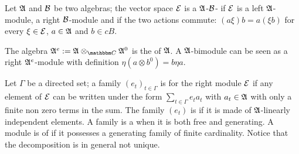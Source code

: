 Let $\mathfrak{A}$ and $\mathcal{B}$ be two algebras; the vector space $\mathcal{E}$ is a $\mathfrak{A}$-$\mathcal{B}$- if $\mathcal{E}$ is a left $\mathfrak{A}$-module, a right $\mathcal{B}$-module and if the two actions commute: $(a\xi)b=a(\xi b)$ for every $\xi\in\mathcal{E}$, $a\in\mathfrak{A}$ and $b\in cB$.

The algebra $\cA^e:=\cA\otimes_{\eC}\cA^0$ is the  of $\mathfrak{A}$. A $\mathfrak{A}$-bimodule can be seen as a right $\mathfrak{A}^e$-module with definition $\eta(a\otimes b^0)=b\eta a$.

Let $\Gamma$ be a directed set; a family $(e_t)_{t\in \Gamma}$ is  for the right module $\mathcal{E}$ if any element of $\mathcal{E}$ can be written under the form $\sum_{t\in \Gamma}e_ta_t$ with $a_t\in\mathfrak{A}$ with only a finite non zero terms in the sum. The family $(e_t)$ is  if it is made of $\mathfrak{A}$-linearly independent elements. A family is a  when it is both free and generating. A module is of  if it possesses a generating family of finite cardinality. Notice that the decomposition is in general not unique.

